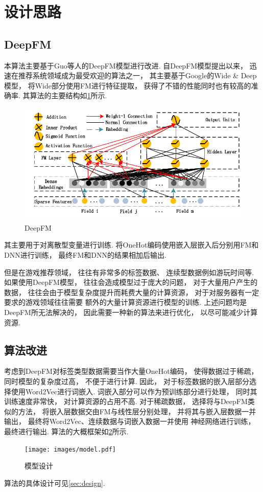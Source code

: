 \section{设计思路}

\subsection{DeepFM}

本算法主要基于Guo等人的DeepFM模型\cite{guoDeepFMFactorizationMachineBased2017}进行改进.
自DeepFM模型提出以来，
迅速在推荐系统领域成为最受欢迎的算法之一，
其主要基于Google的Wide \& Deep模型，
将Wide部分使用FM进行特征提取，
获得了不错的性能同时也有较高的准确率.
其算法的主要结构如\cref{fig:deepfm}所示.

\begin{figure}[!htbp]
	\centering
	\includegraphics[width=.9\textwidth]{images/architecture-deepfm.pdf}
	\caption{DeepFM}\label{fig:deepfm}
\end{figure}

其主要用于对离散型变量进行训练.
将OneHot编码使用嵌入层嵌入后分别用FM和DNN进行训练，
最终FM和DNN的结果相加后输出.

但是在游戏推荐领域，
往往有非常多的标签数据、
连续型数据例如游玩时间等.
如果使用DeepFM模型，
往往会造成模型过于庞大的问题，
对于大量用户产生的数据，
往往会由于模型复杂度提升而耗费大量的计算资源，
对于对服务器有一定要求的游戏领域往往需要
额外的大量计算资源进行模型的训练.
上述问题均是DeepFM所无法解决的，
因此需要一种新的算法来进行优化，
以尽可能减少计算资源.

\subsection{算法改进}

考虑到DeepFM对标签类型数据需要当作大量OneHot编码，
使得数据过于稀疏，
同时模型的复杂度过高，
不便于进行计算.
因此，
对于标签数据的嵌入层部分选择使用Word2Vec进行词嵌入.
词嵌入部分可以作为预训练部分进行处理，
同时其训练速度非常快，
对计算资源的占用不高.
对于稀疏数据，
选择将与DeepFM类似的方法，
将嵌入层数据交由FM与线性层分别处理，
并将其与嵌入层数据一并输出，
最终将Word2Vec、连续数据与词嵌入数据一并使用
神经网络进行训练，
最终进行输出.
算法的大概框架如\cref{fig:model}所示.

\begin{figure}[!htbp]
	\centering
	\texttt{[image: images/model.pdf]}
	\caption{模型设计}\label{fig:model}
\end{figure}

算法的具体设计可见\cref{sec:design}.